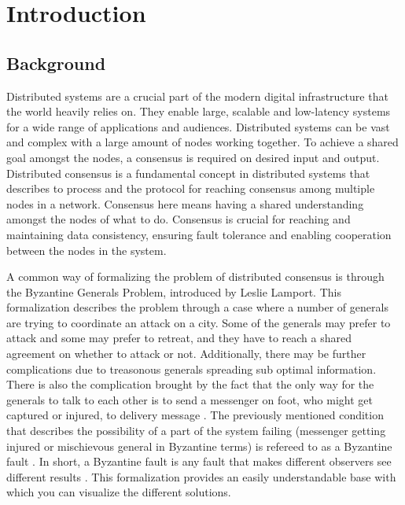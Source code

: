 \section{Introduction}
\thispagestyle{empty}

\subsection{Background}

Distributed systems are a crucial part of the modern digital infrastructure that the world heavily relies on. They enable large, scalable and low-latency systems for a wide range of applications and audiences. Distributed systems can be vast and complex with a large amount of nodes working together. To achieve a shared goal amongst the nodes, a consensus is required on desired input and output. Distributed consensus is a fundamental concept in distributed systems that describes to process and the protocol for reaching consensus among multiple nodes in a network. Consensus here means having a shared understanding amongst the nodes of what to do. Consensus is crucial for reaching and maintaining data consistency, ensuring fault tolerance and enabling cooperation between the nodes in the system. 

A common way of formalizing the problem of distributed consensus is through the Byzantine Generals Problem, introduced by Leslie Lamport. This formalization describes the problem through a case where a number of generals are trying to coordinate an attack on a city. Some of the generals may prefer to attack and some may prefer to retreat, and they have to reach a shared agreement on whether to attack or not. Additionally, there may be further complications due to treasonous generals spreading sub optimal information. There is also the complication brought by the fact that the only way for the generals to talk to each other is to send a messenger on foot, who might get captured or injured, to delivery message \cite{lamportByzantineGeneralsProblem}. 
The previously mentioned condition that describes the possibility of a part of the system failing (messenger getting injured or mischievous general in Byzantine terms) is refereed to as a Byzantine fault \cite{lamportByzantineGeneralsProblem}. In short, a Byzantine fault is any fault that makes different observers see different results \cite{driscollRealByzantineGenerals2004}.
This formalization provides an easily understandable base with which you can visualize the different solutions.

